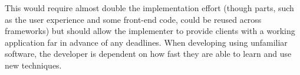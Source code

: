 This would require almost double the implementation effort (though parts, such
as the user experience and some front-end code, could be reused across
frameworks) but should allow the implementer to provide clients with a working
application far in advance of any deadlines. When developing using unfamiliar
software, the developer is dependent on how fast they are able to learn and
use new techniques.
